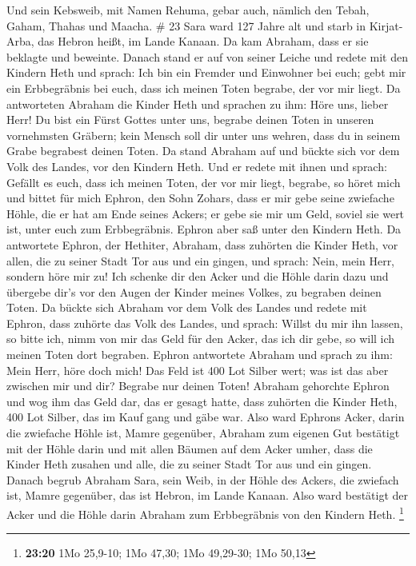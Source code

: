  Und sein Kebsweib, mit Namen Rehuma, gebar auch, nämlich
den Tebah, Gaham, Thahas und Maacha. \# 23  Sara ward 127
Jahre alt  und starb in Kirjat-Arba, das Hebron heißt, im
Lande Kanaan. Da kam Abraham, dass er sie beklagte und beweinte.
 Danach stand er auf von seiner Leiche und redete mit den
Kindern Heth und sprach:  Ich bin ein Fremder und
Einwohner bei euch; gebt mir ein Erbbegräbnis bei euch, dass ich meinen
Toten begrabe, der vor mir liegt.  Da antworteten Abraham
die Kinder Heth und sprachen zu ihm:  Höre uns, lieber
Herr! Du bist ein Fürst Gottes unter uns, begrabe deinen Toten in
unseren vornehmsten Gräbern; kein Mensch soll dir unter uns wehren, dass
du in seinem Grabe begrabest deinen Toten.  Da stand
Abraham auf und bückte sich vor dem Volk des Landes, vor den Kindern
Heth.  Und er redete mit ihnen und sprach: Gefällt es
euch, dass ich meinen Toten, der vor mir liegt, begrabe, so höret mich
und bittet für mich Ephron, den Sohn Zohars,  dass er mir
gebe seine zwiefache Höhle, die er hat am Ende seines Ackers; er gebe
sie mir um Geld, soviel sie wert ist, unter euch zum Erbbegräbnis.
 Ephron aber saß unter den Kindern Heth. Da antwortete
Ephron, der Hethiter, Abraham, dass zuhörten die Kinder Heth, vor allen,
die zu seiner Stadt Tor aus und ein gingen, und sprach: 
Nein, mein Herr, sondern höre mir zu! Ich schenke dir den Acker und die
Höhle darin dazu und übergebe dir's vor den Augen der Kinder meines
Volkes, zu begraben deinen Toten.  Da bückte sich Abraham
vor dem Volk des Landes  und redete mit Ephron, dass
zuhörte das Volk des Landes, und sprach: Willst du mir ihn lassen, so
bitte ich, nimm von mir das Geld für den Acker, das ich dir gebe, so
will ich meinen Toten dort begraben.  Ephron antwortete
Abraham und sprach zu ihm:  Mein Herr, höre doch mich!
Das Feld ist 400 Lot Silber wert; was ist das aber zwischen mir und dir?
Begrabe nur deinen Toten!  Abraham gehorchte Ephron und
wog ihm das Geld dar, das er gesagt hatte, dass zuhörten die Kinder
Heth, 400 Lot Silber, das im Kauf gang und gäbe war. 
Also ward Ephrons Acker, darin die zwiefache Höhle ist, Mamre gegenüber,
Abraham zum eigenen Gut bestätigt mit der Höhle darin und mit allen
Bäumen auf dem Acker umher,  dass die Kinder Heth zusahen
und alle, die zu seiner Stadt Tor aus und ein gingen. 
Danach begrub Abraham Sara, sein Weib, in der Höhle des Ackers, die
zwiefach ist, Mamre gegenüber, das ist Hebron, im Lande Kanaan.
 Also ward bestätigt der Acker und die Höhle darin
Abraham zum Erbbegräbnis von den Kindern Heth. \footnote{\textbf{23:20}
  1Mo 25,9-10; 1Mo 47,30; 1Mo 49,29-30; 1Mo 50,13}

